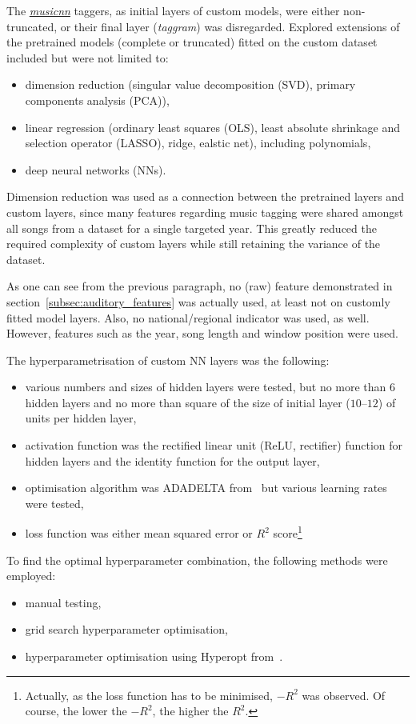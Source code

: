 \documentclass[conference, a4paper, 12pt]{IEEEtran}
\begin{document}
    The \href{http://github.com/jordipons/musicnn}{\emph{musicnn}} taggers, as initial layers of custom models, were either non-truncated, or their final layer (\emph{taggram}) was disregarded. Explored extensions of the pretrained models (complete or truncated) fitted on the custom dataset included but were not limited to:
    \begin{itemize}
        \item dimension reduction (singular value decomposition (SVD), primary components analysis (PCA)),
        \item linear regression (ordinary least squares (OLS), least absolute shrinkage and selection operator (LASSO), ridge, ealstic net), including polynomials,
        \item deep neural networks (NNs).
    \end{itemize}
    Dimension reduction was used as a connection between the pretrained layers and custom layers, since many features regarding music tagging were shared amongst all songs from a dataset for a single targeted year. This greatly reduced the required complexity of custom layers while still retaining the variance of the dataset.

    \par

    As one can see from the previous paragraph, no (raw) feature demonstrated in section~\ref{subsec:auditory_features} was actually used, at least not on customly fitted model layers. Also, no national/regional indicator was used, as well. However, features such as the year, song length and window position were used.

    \par

    The hyperparametrisation of custom NN layers was the following:
    \begin{itemize}
        \item various numbers and sizes of hidden layers were tested, but no more than $ 6 $ hidden layers and no more than square of the size of initial layer ($ 10 $--$ 12 $) of units per hidden layer,
        \item activation function was the rectified linear unit (ReLU, rectifier) function for hidden layers and the identity function for the output layer,
        \item optimisation algorithm was ADADELTA from~\cite{bib:Zeiler2012} but various learning rates were tested,
        \item loss function was either mean squared error or $ R^{2} $ score\footnote{Actually, as the loss function has to be minimised, $ {- R^{2}} $ was observed. Of course, the lower the $ {- R^{2}} $, the higher the $ R^{2} $.}
    \end{itemize}
    To find the optimal hyperparameter combination, the following methods were employed:
    \begin{itemize}
        \item manual testing,
        \item grid search hyperparameter optimisation,
        \item hyperparameter optimisation using Hyperopt from~\cite{bib:Bergstra2013}.
    \end{itemize}
\end{document}
